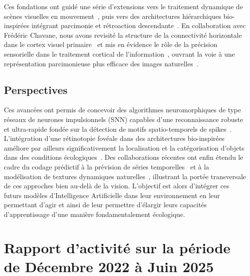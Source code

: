 \documentclass[10pt,french,a4paper]{article}%
\begin{document}
Ces fondations ont guidé une série d'extensions vers le traitement dynamique de scènes visuelles en mouvement~\citep{KhoeiMassonPerrinet17}, puis vers des architectures hiérarchiques bio-inspirées intégrant parcimonie et rétroaction descendante~\citep{BoutinFranciosiniChavaneRuffierPerrinet20,Franciosini21}. En collaboration avec Frédéric Chavane, nous avons revisité la structure de la connectivité horizontale dans le cortex visuel primaire~\citep{Chavane22} et mis en évidence le rôle de la précision sensorielle dans le traitement cortical de l'information~\citep{Ladret23}, ouvrant la voie à une représentation parcimonieuse plus efficace des images naturelles~\citep{Ladret24sparse}.

\subsection*{Perspectives}

Ces avancées ont permis de concevoir des algorithmes neuromorphiques de type réseaux de neurones impulsionnels (SNN) capables d'une reconnaissance robuste et ultra-rapide fondée sur la détection de motifs spatio-temporels de spikes~\citep{Grimaldi24}. L'intégration d'une rétinotopie fovéale dans des architectures bio-inspirées améliore par ailleurs significativement la localisation et la catégorisation d'objets dans des conditions écologiques~\citep{Jeremie25,Jeremie25thesis}. Des collaborations récentes ont enfin étendu le cadre du codage prédictif à la prévision de séries temporelles~\citep{Gunasekaran25} et à la modélisation de textures dynamiques naturelles~\citep{Meso25}, illustrant la portée transversale de ces approches bien au-delà de la vision. L'objectif est alors d'intégrer ces futurs modèles d'Intelligence Artificielle dans leur environnement en leur permettant d'agir et ainsi de leur permettre d'élargir leurs capacités d'apprentissage d'une manière fondamentalement écologique.


\newpage
\section{Rapport d’activité sur la période de Décembre 2022 à  Juin 2025} %
\end{document}
